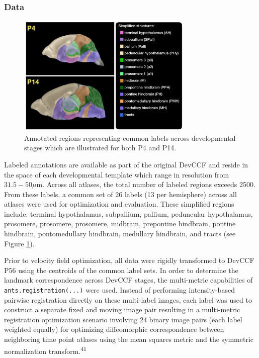 \documentclass[
  12pt,
]{article}
\begin{document}
\hypertarget{data}{%
\subsubsection{Data}\label{data}}

\begin{figure}[!htb]
\centering
\includegraphics[width=0.75\textwidth]{Figures/SimplifiedAnnotations.pdf}
\caption{Annotated regions representing common labels across developmental stages which
are illustrated for both P4 and P14.}
\label{fig:simplifiedannotations}
\end{figure}

Labeled annotations are available as part of the original DevCCF and
reside in the space of each developmental template which range in
resolution from \(31.5-50 \mu\)m. Across all atlases, the total number
of labeled regions exceeds 2500. From these labels, a common set of 26
labels (13 per hemisphere) across all atlases were used for optimization
and evaluation. These simplified regions include: terminal hypothalamus,
subpallium, pallium, peduncular hypothalamus, prosomere, prosomere,
prosomere, midbrain, prepontine hindbrain, pontine hindbrain,
pontomedullary hindbrain, medullary hindbrain, and tracts (see Figure
\ref{fig:simplifiedannotations}).

Prior to velocity field optimization, all data were rigidly transformed
to DevCCF P56 using the centroids of the common label sets. In order to
determine the landmark correspondence across DevCCF stages, the
multi-metric capabilities of \texttt{ants.registration(...)} were used.
Instead of performing intensity-based pairwise registration directly on
these multi-label images, each label was used to construct a separate
fixed and moving image pair resulting in a multi-metric registration
optimization scenario involving 24 binary image pairs (each label
weighted equally) for optimizing diffeomorphic correspondence between
neighboring time point atlases using the mean squares metric and the
symmetric normalization transform.\textsuperscript{41}
\end{document}
